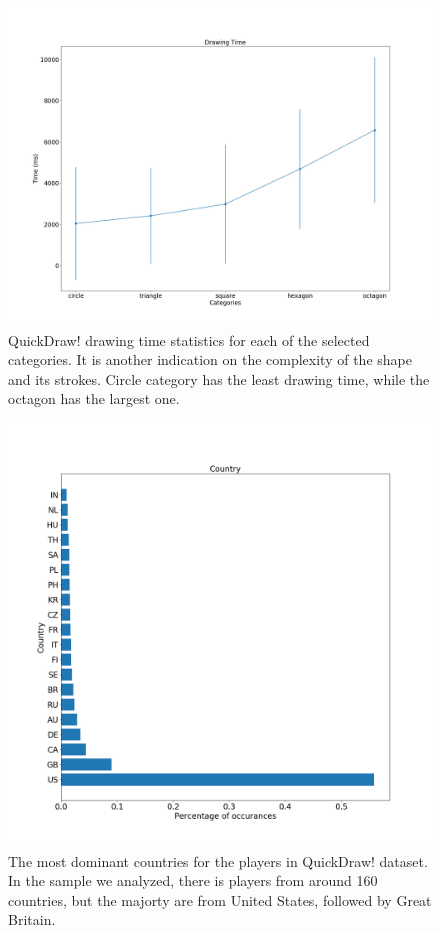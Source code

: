 \begin{figure}
    \centering
    \includegraphics[scale=0.4]{images/dataset/quickdraw_drawing_time.png}
    \caption{QuickDraw! drawing time statistics for each of the selected categories. It is another indication on the complexity of the shape and its strokes. Circle category has the least drawing time, while the octagon has the largest one.}
    \label{fig:quickdraw_drawing_time}
\end{figure}

\begin{figure}
    \centering
    \includegraphics[scale=0.4]{images/dataset/quickdraw_countries.png}
    \caption{The most dominant countries for the players in QuickDraw! dataset. In the sample we analyzed, there is players from around 160 countries, but the majorty are from United States, followed by Great Britain.}
    \label{fig:quickdraw_countries}
\end{figure}

